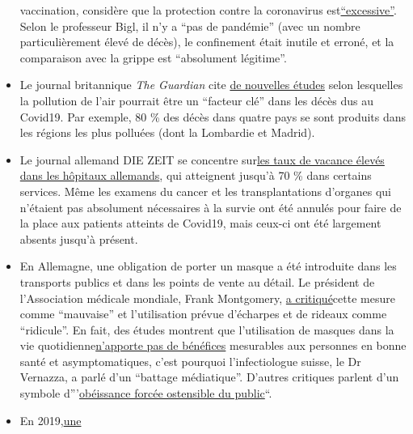 \begin{itemize}
  vaccination, considère que la protection contre la coronavirus
  est\href{https://www.pressreader.com/germany/dresdner-neueste-nachrichten/20200423/281496458428447}{``excessive''}.
  Selon le professeur Bigl, il n'y a ``pas de pandémie'' (avec un nombre
  particulièrement élevé de décès), le confinement était inutile et
  erroné, et la comparaison avec la grippe est ``absolument légitime''.
\item
  Le journal britannique \emph{The Guardian} cite
  \href{https://www.theguardian.com/environment/2020/apr/20/air-pollution-may-be-key-contributor-to-covid-19-deaths-study?utm_medium}{de
  nouvelles études} selon lesquelles la pollution de l'air pourrait être
  un ``facteur clé'' dans les décès dus au Covid19. Par exemple, 80 \%
  des décès dans quatre pays se sont produits dans les régions les plus
  polluées (dont la Lombardie et Madrid).
\item
  Le journal allemand DIE ZEIT se concentre
  sur\href{https://www.zeit.de/2020/18/kliniken-coronavirus-intensivbetten-patienten-behandlung-notaufnahme}{les
  taux de vacance élevés dans les hôpitaux allemands}, qui atteignent
  jusqu'à 70 \% dans certains services. Même les examens du cancer et
  les transplantations d'organes qui n'étaient pas absolument
  nécessaires à la survie ont été annulés pour faire de la place aux
  patients atteints de Covid19, mais ceux-ci ont été largement absents
  jusqu'à présent.
\item
  En Allemagne, une obligation de porter un masque a été introduite dans
  les transports publics et dans les points de vente au détail. Le
  président de l'Association médicale mondiale, Frank Montgomery,
  \href{https://www.aerztezeitung.de/Politik/Montgomery-haelt-Maskenpflicht-fuer-falsch-408844.html}{a
  critiqué}cette mesure comme ``mauvaise'' et l'utilisation prévue
  d'écharpes et de rideaux comme ``ridicule''. En fait, des études
  montrent que l'utilisation de masques dans la vie
  quotidienne\href{https://infekt.ch/2020/04/atemschutzmasken-fuer-alle-medienhype-oder-unverzichtbar/}{n'apporte
  pas de bénéfices} mesurables aux personnes en bonne santé et
  asymptomatiques, c'est pourquoi l'infectiologue suisse, le Dr
  Vernazza, a parlé d'un ``battage médiatique''. D'autres critiques
  parlent d'un symbole
  d'''\href{https://multipolar-magazin.de/artikel/maskenpflicht-gesellschaftliches-klima}{obéissance
  forcée ostensible du public}``.
\item
  En
  2019,\href{https://www.heise.de/tp/features/COVID-19-WHO-Studie-findet-kaum-Belege-fuer-die-Wirksamkeit-von-Eindaemmungsmassnahmen-4706446.html}{une
}
\end{itemize}
